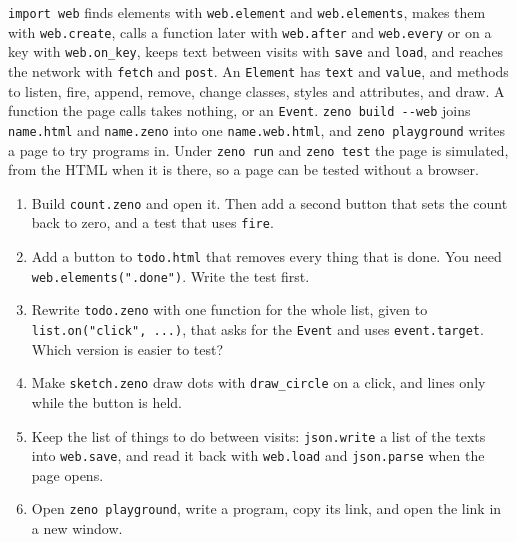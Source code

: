 \begin{summary}
\verb|import web| finds elements with \verb|web.element| and
\verb|web.elements|, makes them with \verb|web.create|, calls a
function later with \verb|web.after| and \verb|web.every| or on a key
with \verb|web.on_key|, keeps text between visits with \verb|save| and
\verb|load|, and reaches the network with \verb|fetch| and \verb|post|.
An \verb|Element| has \verb|text| and \verb|value|, and methods to
listen, fire, append, remove, change classes, styles and attributes,
and draw. A function the page calls takes nothing, or an
\verb|Event|. \verb|zeno build --web| joins \verb|name.html| and
\verb|name.zeno| into one \verb|name.web.html|, and
\verb|zeno playground| writes a page to try programs in. Under
\verb|zeno run| and \verb|zeno test| the page is simulated, from the
HTML when it is there, so a page can be tested without a browser.
\end{summary}

\begin{tryit}
\begin{enumerate}
\item Build \verb|count.zeno| and open it. Then add a second button
  that sets the count back to zero, and a test that uses \verb|fire|.
\item Add a button to \verb|todo.html| that removes every thing that is
  done. You need \verb|web.elements(".done")|. Write the test first.
\item Rewrite \verb|todo.zeno| with one function for the whole list,
  given to \verb|list.on("click", ...)|, that asks for the \verb|Event|
  and uses \verb|event.target|. Which version is easier to test?
\item Make \verb|sketch.zeno| draw dots with \verb|draw_circle| on a
  click, and lines only while the button is held.
\item Keep the list of things to do between visits: \verb|json.write|
  a list of the texts into \verb|web.save|, and read it back with
  \verb|web.load| and \verb|json.parse| when the page opens.
\item Open \verb|zeno playground|, write a program, copy its link, and
  open the link in a new window.
\end{enumerate}
\end{tryit}
